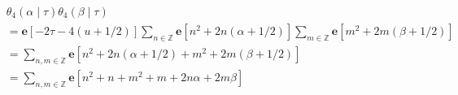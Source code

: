 \documentclass[12pt,b5paper]{ltjsarticle}
\begin{document}
\begin{align}
 & \theta_{4}(\alpha\mid\tau)
 \theta_{4}(\beta\mid\tau)\\
 &=
 \mathbf{e} [-2\tau - 4(u+1/2)]
 \sum_{n\in\mathbb{Z}}
 \mathbf{e}[n^{2} + 2n(\alpha + 1/2)]
 \sum_{m\in\mathbb{Z}}
 \mathbf{e}[m^{2} + 2m(\beta + 1/2)]
 \\
 &=
 \sum_{n,m\in\mathbb{Z}}
 \mathbf{e}[
 n^{2} + 2n(\alpha + 1/2)
 +
 m^{2} + 2m(\beta + 1/2)
 ]\\
 &=
 \sum_{n,m\in\mathbb{Z}}
 \mathbf{e}[
 n^{2} + n + m^{2} + m
 + 2n\alpha  + 2m\beta
 ]
\end{align}


\hrulefill
\end{document}
